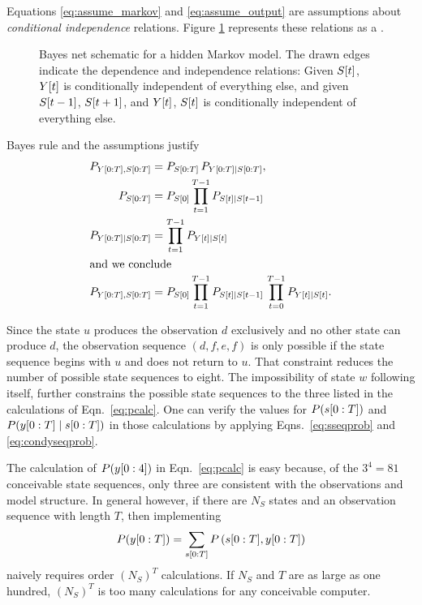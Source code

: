 Equations \eqref{eq:assume_markov} and \eqref{eq:assume_output} are
assumptions about \emph{conditional independence} relations.  Figure
\ref{fig:dhmm_net} represents these relations as a %
\emph{}\cite{Pearl91a}.

\begin{figure}[htbp]
  \centering{\plotsize%
    }
  \caption[Bayes net schematic for a hidden Markov model.]%
  {Bayes net schematic for a hidden Markov model.  The drawn edges
    indicate the dependence and independence relations: Given
    ${S}{[t]}$, ${Y}{[t]}$ is conditionally independent of
    everything else, and given ${S}{[t-1]}$, ${S}{[t+1]}$, and
    ${Y}{[t]}$, ${S}{[t]}$ is conditionally independent of
    everything else.}
  \label{fig:dhmm_net}
\end{figure}

Bayes rule and the assumptions justify
\begin{align}
  P_{\ts{Y}{0}{T},\ts{S}{0}{T}} &= P_{\ts{S}{0}{T}} \, %
                                   P_{\ts{Y}{0}{T}\given \ts{S}{0}{T}},\notag\\
  \label{eq:sseqprob}%
  P_{\ts{S}{0}{T}}              &= P_{\ti{S}{0}} %
                                   \prod_{t=1}^{T-1} P_{\ti{S}{t}\given \ti{S}{t-1}}\\
  \label{eq:condyseqprob}%
  P_{\ts{Y}{0}{T}\given \ts{S}{0}{T}} &= \prod_{t=1}^{T-1} P_{\ti{Y}{t}\given \ti{S}{t}}\\
  \intertext{and we conclude}
  P_{\ts{Y}{0}{T},\ts{S}{0}{T}} &= P_{\ti{S}{0}} %
                                   \prod_{t=1}^{T-1} P_{\ti{S}{t}\given \ti{S}{t-1}}\, %
                                   \prod_{t=0}^{T-1} P_{\ti{Y}{t}\given \ti{S}{t}}.\notag
\end{align}

Since the state $u$ produces the observation $d$ exclusively and no
other state can produce $d$, the observation sequence $(d,f,e,f)$ is
only possible if the state sequence begins with $u$ and does not
return to $u$.  That constraint reduces the number of possible state
sequences to eight.  The impossibility of state $w$ following itself,
further constrains the possible state sequences to the three listed in
the calculations of Eqn.~\eqref{eq:pcalc}.  One can verify the values
for $P(s[0:T])$ and $P(y[0:T]\mid s[0:T])$ in those
calculations by applying Eqns.~\eqref{eq:sseqprob} and
\eqref{eq:condyseqprob}.

The calculation of $P(y[0:4])$ in Eqn.~\eqref{eq:pcalc} is easy
because, of the $3^4 = 81$ conceivable state sequences, only three are
consistent with the observations and model structure.  In general
however, if there are $N_S$ states and an observation sequence with
length $T$, then implementing
\begin{equation*}
  P(y[0:T]) = \sum_{s[0:T]} P\left(s[0:T]
    ,y[0:T] \right)
\end{equation*}
naively requires order $\left(N_S\right)^T$ calculations.  If $N_S$
and $T$ are as large as one hundred, $\left(N_S\right)^T$ is too many
calculations for any conceivable computer.

